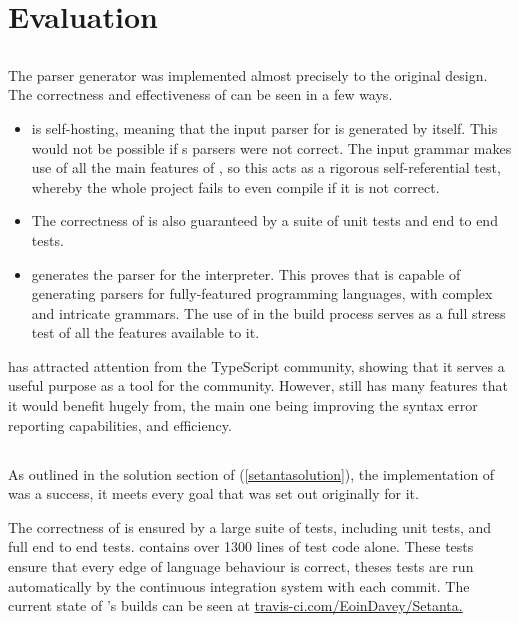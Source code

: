 \chapter{Evaluation}

\section{\tsPEG{}}

The \tsPEG{} parser generator was implemented almost precisely to the original design. The correctness and effectiveness of \tsPEG{} can be seen in a few ways.
\begin{itemize}
    \item \tsPEG{} is self-hosting, meaning that the input parser for \tsPEG{} is generated by \tsPEG{} itself. This would not be possible if \tsPEG{}s parsers were not correct. The input grammar makes use of all the main features of \tsPEG{}, so this acts as a rigorous self-referential test, whereby the whole project fails to even compile if it is not correct.
    \item The correctness of \tsPEG{} is also guaranteed by a suite of unit tests and end to end tests.
    \item \tsPEG{} generates the parser for the \Setanta{} interpreter. This proves that \tsPEG{} is capable of generating parsers for fully-featured programming languages, with complex and intricate grammars. The use of \tsPEG{} in the \Setanta{} build process serves as a full stress test of all the features available to it.
\end{itemize}

\tsPEG{} has attracted attention from the TypeScript community, showing that it serves a useful purpose as a tool for the community. However, \tsPEG{} still has many features that it would benefit hugely from, the main one being improving the syntax error reporting capabilities, and efficiency.

\section{\Setanta{}}

As outlined in the solution section of \Setanta{} (\ref{setantasolution}), the implementation of \Setanta{} was a success, it meets every goal that was set out originally for it.

The correctness of \Setanta{} is ensured by a large suite of tests, including unit tests, and full end to end tests. \Setanta{} contains over 1300 lines of test code alone. These tests ensure that every edge of language behaviour is correct, theses tests are run automatically by the continuous integration system with each commit. The current state of \Setanta{}'s builds can be seen at \href{https://travis-ci.com/EoinDavey/Setanta}{travis-ci.com/EoinDavey/Setanta.}

